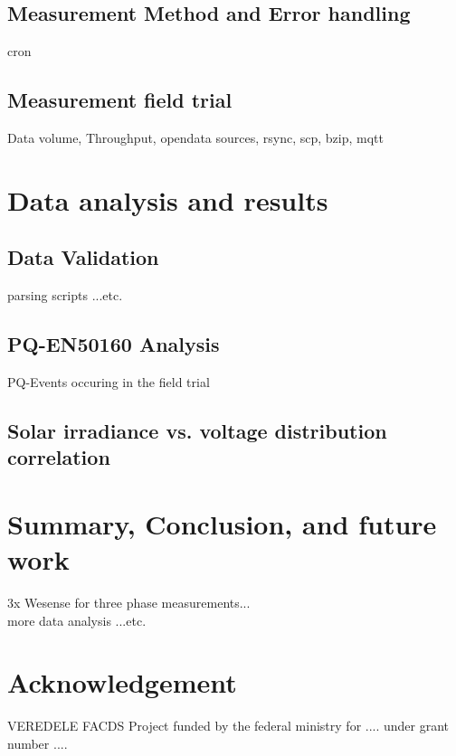 \documentclass{sig-alternate}
\begin{document}
		\subsection{Measurement Method and Error handling}
			cron
		\subsection{Measurement field trial}
			Data volume, Throughput, opendata sources, rsync, scp, bzip, mqtt

        \section{Data analysis and results}
		
		\subsection{Data Validation}
			parsing scripts ...etc.
		
		\subsection{PQ-EN50160 Analysis}
			PQ-Events occuring in the field trial

		\subsection{Solar irradiance vs. voltage distribution correlation}


	\section{Summary, Conclusion, and future work}
	3x Wesense for three phase measurements... \\
	more data analysis ...etc.

	\section{Acknowledgement}
	VEREDELE FACDS Project funded by the federal ministry for .... under grant number ....


	{
	
	\small
	
	}

\end{document}
